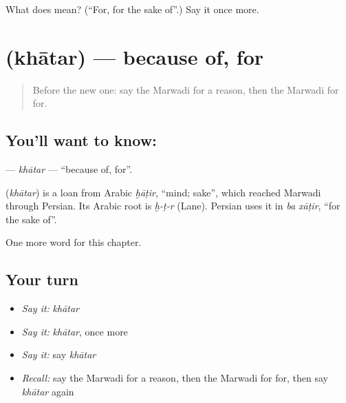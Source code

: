 \begin{tcolorbox}[breakable,colback=teal!4,colframe=teal!35!black,title={Before you move on}]
What does  mean? (\textquotedblleft{}For, for the sake of\textquotedblright{}.) Say it once more.
\end{tcolorbox}
\section[\texorpdfstring{\mw{खातर} (khātar)}{खातर (khātar)}]{ (khātar) — because of, for}

\label{lesson:MW-C117-khatar}



\begin{quote}
Before the new one: say the Marwadi for a reason, then the Marwadi for for.
\end{quote}

\subsection*{You'll want to know: }
\textbf{} — \emph{khātar} — \textquotedblleft{}because of, for\textquotedblright{}.

\begin{cousinweb}
\textbf{} (\emph{khātar}) is a loan from Arabic \emph{ḫāṭir}, \textquotedblleft{}mind; sake\textquotedblright{}, which reached Marwadi through Persian. Its Arabic root is \emph{ḫ-ṭ-r} (Lane). Persian uses it in \emph{ba xāṭir}, \textquotedblleft{}for the sake of\textquotedblright{}.
\end{cousinweb}

\begin{grammarlens}[title={What you've built}]
One more word for this chapter.
\end{grammarlens}

\subsection*{Your turn}
\begin{itemize}
\raggedright
  \item \emph{Say it:} \emph{khātar}
  \item \emph{Say it:} \emph{khātar}, once more
  \item \emph{Say it:} say \emph{khātar}
  \item \emph{Recall:} say the Marwadi for a reason, then the Marwadi for for, then say \emph{khātar} again
\end{itemize}


